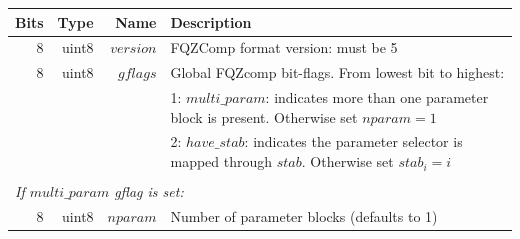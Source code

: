 \documentclass[a4paper]{article}
\begin{document}
\begin{table}
\centering
\begin{tabular}{|r|r|r|r|r|p{8cm}|l|l|} 
\hline
\multicolumn{3}{|r|}{\textbf{Bits} }                   & \textbf{Type}  & \textbf{Name}                  & \multicolumn{3}{p{8.8cm}|}{\textbf{Description}} \\ 
\hline
\multicolumn{3}{|r|}{8}                                & uint8          & $version$                      & \multicolumn{3}{p{8.8cm}|}{FQZComp format version: must be 5}\\
\hline
\multicolumn{3}{|r|}{8}                                & uint8          & $gflags$                       & \multicolumn{3}{p{8.8cm}|}{Global FQZcomp bit-flags. From lowest bit to highest:}\\
\multicolumn{3}{|r|}{}                                 &                &                                & \multicolumn{3}{p{8.8cm}|}{1: $multi\_param$: indicates more than one parameter block is present.  Otherwise set $nparam = 1$} \\
\multicolumn{3}{|r|}{}                                 &                &                                & \multicolumn{3}{p{8.8cm}|}{2: $have\_stab$: indicates the parameter selector is mapped through $stab$.  Otherwise set $stab_i = i$} \\ 
\hline

\multicolumn{8}{|l|}{}\\[-0.7em]
\multicolumn{8}{|l|}{\textit{If $multi\_param$ gflag is set:} } \\ 
\cline{2-7}
                       & \multicolumn{2}{r|}{8}        & uint8          & \multicolumn{1}{r|}{$nparam$ } & \multicolumn{2}{p{8.4cm}|}{Number of parameter blocks (defaults to 1)} & \\
\cline{2-7}


\end{tabular}
\end{table}
\end{document}
